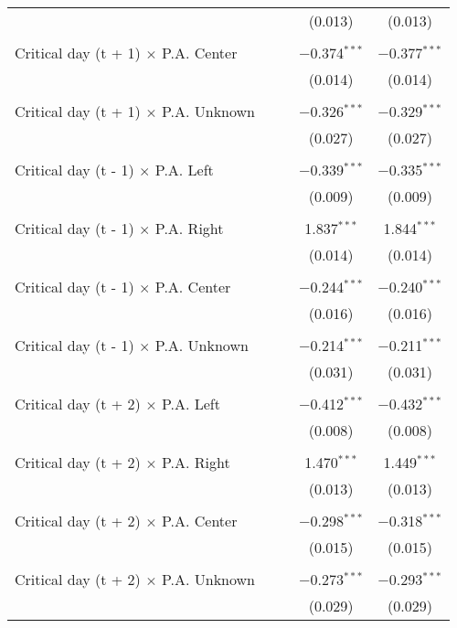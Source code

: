 \documentclass[
]{article}
\begin{document}
\begin{table}[!htbp]
{\begin{tabular}{@{\extracolsep{5pt}}lcccc}
  &  &  & (0.013) & (0.013) \\ 
  & & & & \\ 
 Critical day (t + 1) $\times$ P.A. Center &  &  & $-$0.374$^{***}$ & $-$0.377$^{***}$ \\ 
  &  &  & (0.014) & (0.014) \\ 
  & & & & \\ 
 Critical day (t + 1) $\times$ P.A. Unknown &  &  & $-$0.326$^{***}$ & $-$0.329$^{***}$ \\ 
  &  &  & (0.027) & (0.027) \\ 
  & & & & \\ 
 Critical day (t - 1) $\times$ P.A. Left &  &  & $-$0.339$^{***}$ & $-$0.335$^{***}$ \\ 
  &  &  & (0.009) & (0.009) \\ 
  & & & & \\ 
 Critical day (t - 1) $\times$ P.A. Right &  &  & 1.837$^{***}$ & 1.844$^{***}$ \\ 
  &  &  & (0.014) & (0.014) \\ 
  & & & & \\ 
 Critical day (t - 1) $\times$ P.A. Center &  &  & $-$0.244$^{***}$ & $-$0.240$^{***}$ \\ 
  &  &  & (0.016) & (0.016) \\ 
  & & & & \\ 
 Critical day (t - 1) $\times$ P.A. Unknown &  &  & $-$0.214$^{***}$ & $-$0.211$^{***}$ \\ 
  &  &  & (0.031) & (0.031) \\ 
  & & & & \\ 
 Critical day (t + 2) $\times$ P.A. Left &  &  & $-$0.412$^{***}$ & $-$0.432$^{***}$ \\ 
  &  &  & (0.008) & (0.008) \\ 
  & & & & \\ 
 Critical day (t + 2) $\times$ P.A. Right &  &  & 1.470$^{***}$ & 1.449$^{***}$ \\ 
  &  &  & (0.013) & (0.013) \\ 
  & & & & \\ 
 Critical day (t + 2) $\times$ P.A. Center &  &  & $-$0.298$^{***}$ & $-$0.318$^{***}$ \\ 
  &  &  & (0.015) & (0.015) \\ 
  & & & & \\ 
 Critical day (t + 2) $\times$ P.A. Unknown &  &  & $-$0.273$^{***}$ & $-$0.293$^{***}$ \\ 
  &  &  & (0.029) & (0.029) \\ 

\end{tabular}}
\end{table}
\end{document}
